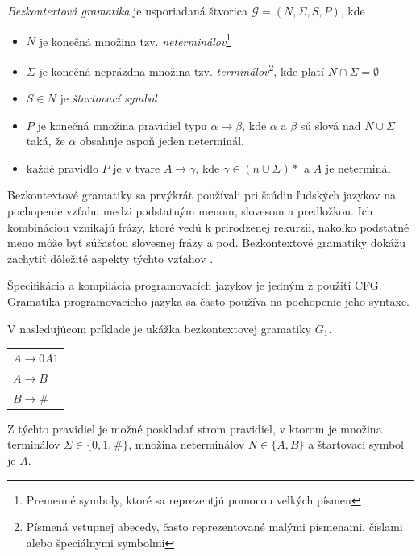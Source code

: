 \begin{definice}
\textit{Bezkontextová gramatika} je usporiadaná štvorica $\mathcal{G} = (N, \Sigma , S, P)$, kde
\begin{itemize}
\item $N$ je konečná množina tzv. \textit{neterminálov}\footnote{Premenné symboly, ktoré sa reprezentjú pomocou velkých písmen}
\item $\Sigma$ je konečná neprázdna množina tzv. \textit{terminálov}\footnote{Písmená vstupnej abecedy, často reprezentované malými písmenami, číslami alebo špeciálnymi symbolmi}, kde platí $N \cap \Sigma = \emptyset$
\item $S \in N$ je \textit{štartovací symbol}
\item $P$ je konečná množina pravidiel typu $\alpha \rightarrow \beta$, kde $\alpha$ a $\beta$ sú slová nad $N \cup \Sigma$ taká, že $\alpha$ obsahuje aspoň jeden neterminál. 
\item každé pravidlo $P$ je v tvare $A \rightarrow \gamma$, kde $\gamma \in (n \cup \Sigma)*$ a $A$ je neterminál \cite{demlova:gramatiky}
\end{itemize}
\end{definice}

Bezkontextové gramatiky sa prvýkrát používali pri štúdiu ľudských jazykov na pochopenie vzťahu medzi podstatným menom, slovesom a predložkou. Ich kombináciou vznikajú frázy, ktoré vedú k prirodzenej rekurzii, nakoľko podstatné meno môže byť súčasťou slovesnej frázy a pod. Bezkontextové gramatiky dokážu zachytiť dôležité aspekty týchto vzťahov \cite{computation_theory}.

Špecifikácia a kompilácia programovacích jazykov je jedným z použití CFG. Gramatika programovacieho jazyka sa často používa na pochopenie jeho syntaxe.

V nasledujúcom príklade je ukážka bezkontextovej gramatiky $G_1$.
\begin{center}
\begin{tabular}{p{}}
$A \rightarrow 0A1$\\
$A \rightarrow B$\\
$B \rightarrow $\#
\end{tabular}
\end{center}

Z týchto pravidiel je možné poskladať strom pravidiel, v ktorom je množina terminálov $\Sigma \in \{0,1,\#\}$, množina neterminálov $N \in \{A, B\}$ a štartovací symbol je $A$. 

